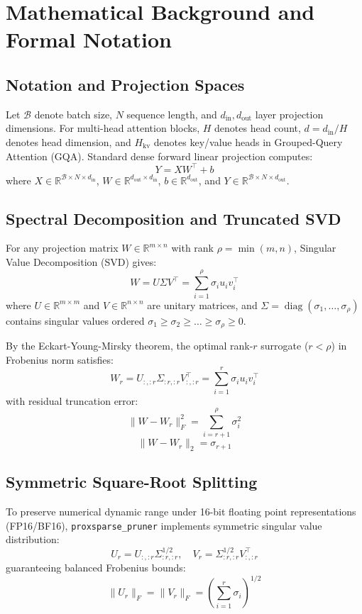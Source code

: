 \section{Mathematical Background and Formal Notation}

\subsection{Notation and Projection Spaces}
Let $\mathcal{B}$ denote batch size, $N$ sequence length, and $d_{\text{in}}, d_{\text{out}}$ layer projection dimensions. For multi-head attention blocks, $H$ denotes head count, $d = d_{\text{in}} / H$ denotes head dimension, and $H_{\text{kv}}$ denotes key/value heads in Grouped-Query Attention (GQA).
Standard dense forward linear projection computes:
\[
Y = X W^\top + b
\]
where $X \in \mathbb{R}^{\mathcal{B} \times N \times d_{\text{in}}}$, $W \in \mathbb{R}^{d_{\text{out}} \times d_{\text{in}}}$, $b \in \mathbb{R}^{d_{\text{out}}}$, and $Y \in \mathbb{R}^{\mathcal{B} \times N \times d_{\text{out}}}$.

\subsection{Spectral Decomposition and Truncated SVD}
For any projection matrix $W \in \mathbb{R}^{m \times n}$ with rank $\rho = \min(m, n)$, Singular Value Decomposition (SVD) gives:
\[
W = U \Sigma V^\top = \sum_{i=1}^{\rho} \sigma_i u_i v_i^\top
\]
where $U \in \mathbb{R}^{m \times m}$ and $V \in \mathbb{R}^{n \times n}$ are unitary matrices, and $\Sigma = \operatorname{diag}(\sigma_1, \dots, \sigma_\rho)$ contains singular values ordered $\sigma_1 \ge \sigma_2 \ge \dots \ge \sigma_\rho \ge 0$.

By the Eckart-Young-Mirsky theorem, the optimal rank-$r$ surrogate ($r < \rho$) in Frobenius norm satisfies:
\[
W_r = U_{:, :r} \Sigma_{:r, :r} V_{:, :r}^\top = \sum_{i=1}^{r} \sigma_i u_i v_i^\top
\]
with residual truncation error:
\[
\|W - W_r\|_F^2 = \sum_{i=r+1}^{\rho} \sigma_i^2
\]
\[
\|W - W_r\|_2 = \sigma_{r+1}
\]

\subsection{Symmetric Square-Root Splitting}
To preserve numerical dynamic range under 16-bit floating point representations (FP16/BF16), \texttt{proxsparse\_pruner} implements symmetric singular value distribution:
\[
U_r = U_{:, :r} \Sigma_{:r, :r}^{1/2}, \quad V_r = \Sigma_{:r, :r}^{1/2} V_{:, :r}^\top
\]
guaranteeing balanced Frobenius bounds:
\[
\|U_r\|_F = \|V_r\|_F = \left( \sum_{i=1}^{r} \sigma_i \right)^{1/2}
\]

